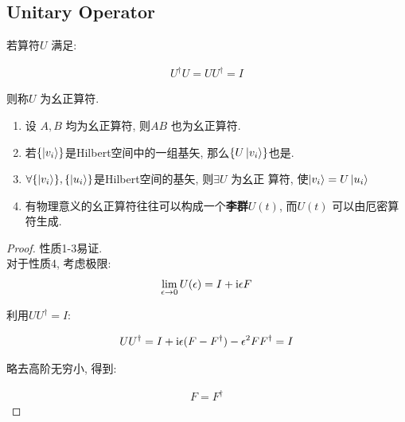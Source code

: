 \subsection{Unitary Operator}

\begin{definition}[幺正算符]
  若算符$U$ 满足:

  \begin{equation}
    \begin{aligned}
      U^{\dagger} U = U U^{\dagger} = I
    \end{aligned}
  \end{equation}

  则称$U$ 为幺正算符.
\end{definition}

\begin{theorem}[幺正算符的性质]
  \begin{enumerate}
    \item 设 $A,B$ 均为幺正算符, 则$AB$ 也为幺正算符.
    \item 若$\{\ket{v_{i}}\}$是Hilbert空间中的一组基矢, 那么$\{U\ket{v_{i}}\}$也是.
    \item $\forall \{\ket{v_{i}}\},\{\ket{u_{i}}\}$是Hilbert空间的基矢, 则$\exists U$ 为幺正
      算符, 使$\ket{v_{i}} = U \ket{u_{i}}$
    \item 有物理意义的幺正算符往往可以构成一个{\bf 李群}$U(t)$, 而$U(t)$ 可以由厄密算符生成.
  \end{enumerate}
\end{theorem}

\begin{proof}
  性质1-3易证.\\
  对于性质4, 考虑极限:
  \begin{equation}
    \begin{aligned}
      \lim_{\epsilon\to 0} U(\epsilon) = I + {\rm i}\epsilon F
    \end{aligned}
  \end{equation}

  利用$UU^{\dagger}=I$:

  \begin{equation}
    \begin{aligned}
      UU^{\dagger} = I + {\rm i}\epsilon(F - F^{\dagger}) - \epsilon^{2}FF^{\dagger} = I
    \end{aligned}
  \end{equation}

  略去高阶无穷小, 得到:

  \begin{equation}
    \begin{aligned}
      F = F^{\dagger}
    \end{aligned}
  \end{equation}
\end{proof}

